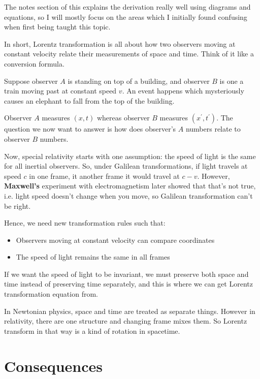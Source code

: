 The notes section of this explains the derivation really well using diagrams and equations, so I will mostly focus on the areas which I initially found confusing when first being taught this topic. 

In short, Lorentz transformation is all about how two observers moving at constant velocity relate their measurements of space and time. Think of it like a conversion formula. 

Suppose observer $A$ is standing on top of a building, and observer $B$ is one a train moving past at constant speed $v$. An event happens which mysteriously causes an elephant to fall from the top of the building. 

Observer $A$ measures $(x, t)$ whereas observer $B$ measures $(x^\prime, t^\prime)$. The question we now want to answer is how does observer's $A$ numbers relate to observer $B$ numbers. 

Now, special relativity starts with one assumption: the speed of light is the same for all inertial observers. So, under Galilean transformations, if light travels at speed $c$ in one frame, it another frame it would travel at $c-v$. However,\textbf{ Maxwell's} experiment with electromagnetism later showed that that's not true, i.e. light speed doesn't change when you move, so Galilean transformation can't be right. 

Hence, we need new transformation rules such that: 
\begin{itemize}
    \item Observers moving at constant velocity can compare coordinates 
    \item The speed of light remains the same in all frames
\end{itemize}

If we want the speed of light to be invariant, we must preserve both space and time instead of preserving time separately, and this is where we can get Lorentz transformation equation from. 

In Newtonian physics, space and time are treated as separate things. However in relativity, there are one structure and changing frame mixes them. So Lorentz transform in that way is a kind of rotation in spacetime. 

\section{Consequences}






